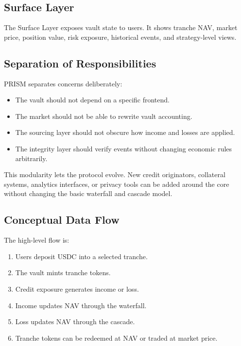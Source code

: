 \documentclass[11pt]{article}
\begin{document}
\subsection{Surface Layer}

The Surface Layer exposes vault state to users. It shows tranche NAV, market
price, position value, risk exposure, historical events, and strategy-level
views.

\subsection{Separation of Responsibilities}

PRISM separates concerns deliberately:

\begin{itemize}
  \item The vault should not depend on a specific frontend.
  \item The market should not be able to rewrite vault accounting.
  \item The sourcing layer should not obscure how income and losses are applied.
  \item The integrity layer should verify events without changing economic rules
  arbitrarily.
\end{itemize}

This modularity lets the protocol evolve. New credit originators, collateral
systems, analytics interfaces, or privacy tools can be added around the core
without changing the basic waterfall and cascade model.

\subsection{Conceptual Data Flow}

The high-level flow is:

\begin{enumerate}
  \item Users deposit USDC into a selected tranche.
  \item The vault mints tranche tokens.
  \item Credit exposure generates income or loss.
  \item Income updates NAV through the waterfall.
  \item Loss updates NAV through the cascade.
  \item Tranche tokens can be redeemed at NAV or traded at market price.
\end{enumerate}
\end{document}
